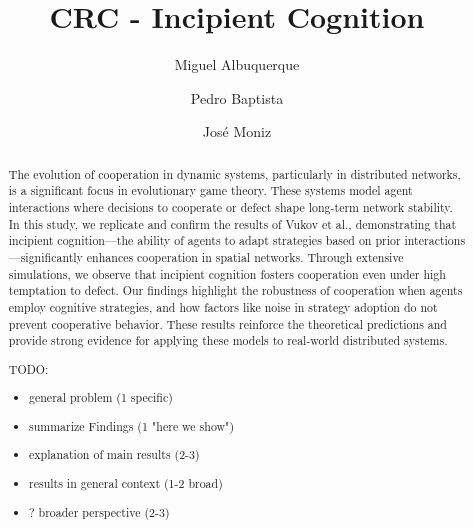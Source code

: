 \documentclass[runningheads]{llncs}
\begin{document}
%
\title{CRC - Incipient Cognition}


%
%
\author{Miguel Albuquerque \and
Pedro Baptista \and José Moniz}


%
\maketitle              %
%



\begin{abstract}
The evolution of cooperation in dynamic systems, particularly in distributed networks, is a significant focus in evolutionary game theory. These systems model agent interactions where decisions to cooperate or defect shape long-term network stability. In this study, we replicate and confirm the results of Vukov et al., demonstrating that incipient cognition—the ability of agents to adapt strategies based on prior interactions—significantly enhances cooperation in spatial networks. Through extensive simulations, we observe that incipient cognition fosters cooperation even under high temptation to defect. Our findings highlight the robustness of cooperation when agents employ cognitive strategies, and how factors like noise in strategy adoption do not prevent cooperative behavior. These results reinforce the theoretical predictions and provide strong evidence for applying these models to real-world distributed systems.

TODO:
\begin{itemize}
    \item general problem (1 specific)
    \item summarize Findings (1 "here we show")
    \item explanation of main results (2-3)
    \item results in general context (1-2 broad)
    \item ? broader perspective (2-3)
\end{itemize}

\end{abstract}
\end{document}
